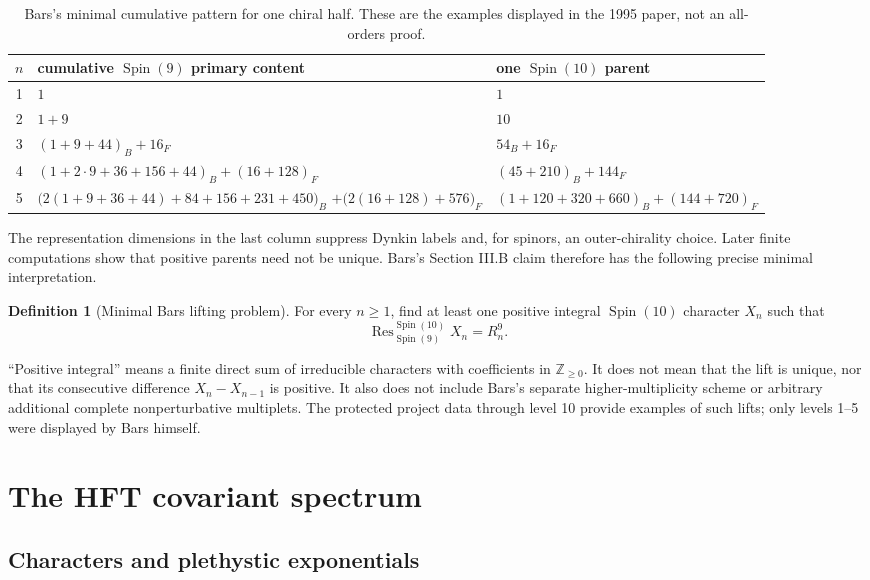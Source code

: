 \documentclass[11pt,a4paper]{article}
\theoremstyle{definition}
\newtheorem{definition}[theorem]{Definition}
\newcommand{\Spin}{\operatorname{Spin}}
\newcommand{\Res}{\operatorname{Res}}
\begin{document}
\begin{table}[H]
\centering
\caption{Bars's minimal cumulative pattern for one chiral half.  These are
the examples displayed in the 1995 paper, not an all-orders proof.}
\label{tab:bars-low-levels}
\begin{tabularx}{\textwidth}{cXl}
\toprule
$n$ & cumulative $\Spin(9)$ primary content & one $\Spin(10)$ parent \\
\midrule
1 & $1$ & $1$ \\
2 & $1+9$ & $10$ \\
3 & $(1+9+44)_B+16_F$ & $54_B+16_F$ \\
4 & $(1+2\cdot9+36+156+44)_B+(16+128)_F$
  & $(45+210)_B+144_F$ \\
5 & $\bigl(2(1+9+36+44)+84+156+231+450\bigr)_B$
    $+\bigl(2(16+128)+576\bigr)_F$
  & $(1+120+320+660)_B+(144+720)_F$ \\
\bottomrule
\end{tabularx}
\end{table}

The representation dimensions in the last column suppress Dynkin labels and,
for spinors, an outer-chirality choice.  Later finite computations show that
positive parents need not be unique.  Bars's Section III.B claim therefore
has the following precise minimal interpretation.

\begin{definition}[Minimal Bars lifting problem]
For every $n\geq1$, find at least one positive integral $\Spin(10)$
character $X_n$ such that
\[
   \Res^{\Spin(10)}_{\Spin(9)}X_n=R_n^9.
\]
\end{definition}

``Positive integral'' means a finite direct sum of irreducible characters
with coefficients in $\mathbb Z_{\geq0}$.  It does not mean that the lift is
unique, nor that its consecutive difference $X_n-X_{n-1}$ is positive.  It
also does not include Bars's separate higher-multiplicity scheme or arbitrary
additional complete nonperturbative multiplets.  The protected project data
through level 10 provide examples of such lifts; only levels 1--5 were
displayed by Bars himself.

\section{The HFT covariant spectrum}

\subsection{Characters and plethystic exponentials}
\end{document}

